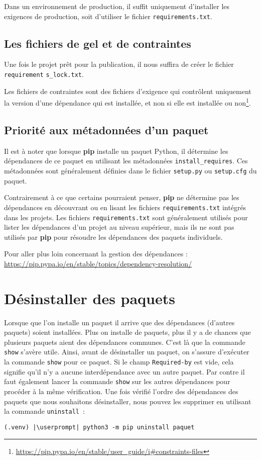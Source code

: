Dans un environnement de production, il suffit uniquement d’installer les exigences de production, soit d'utiliser le fichier \texttt{requirements.txt}.

\subsection*{Les fichiers de gel et de contraintes}
Une fois le projet prêt pour la publication, il nous suffira de créer le fichier \texttt{requirement} \texttt{s\_lock.txt}.

Les fichiers de contraintes sont des fichiers d'exigence qui contrôlent uniquement la version d'une dépendance qui est installée, et non si elle est installée ou non\footnote{\url{https://pip.pypa.io/en/stable/user_guide/i\#constraints-files}}.

\subsection*{Priorité aux métadonnées d'un paquet}
Il est à noter que lorsque \textbf{pip} installe un paquet Python, il détermine les dépendances de ce paquet en utilisant les métadonnées \texttt{install\_requires}. Ces métadonnées sont généralement définies dans le fichier \texttt{setup.py} ou \texttt{setup.cfg} du paquet.

Contrairement à ce que certains pourraient penser, \textbf{pip} ne détermine pas les dépendances en découvrant ou en lisant les fichiers \texttt{requirements.txt} intégrés dans les projets. Les fichiers \texttt{requirements.txt} sont généralement utilisés pour lister les dépendances d'un projet au niveau supérieur, mais ils ne sont pas utilisés par \textbf{pip} pour résoudre les dépendances des paquets individuels.

Pour aller plus loin concernant la gestion des dépendances : \url{https://pip.pypa.io/en/stable/topics/dependency-resolution/}

\section{Désinstaller des paquets}
Lorsque que l'on installe un paquet il arrive que des dépendances (d'autres paquets) soient installées. Plus on installe de paquets, plus il y a de chances que plusieurs paquets aient des dépendances communes. C’est là que la commande \texttt{show} s’avère utile. Ainsi, avant de désinstaller un paquet, on s'assure d’exécuter la commande \texttt{show} pour ce paquet. Si le champ \texttt{Required-by} est vide, cela signifie qu'il n'y a aucune interdépendance avec un autre paquet. Par contre il faut également lancer la commande \texttt{show} sur les autres dépendances pour procéder à la même vérification. Une fois vérifié l’ordre des dépendances des paquets que nous souhaitons désinstaller, nous pouvez les supprimer en utilisant la commande \texttt{uninstall} :
\begin{lstlisting}[style=bash]
(.venv) |\userprompt| python3 -m pip uninstall paquet
\end{lstlisting}

